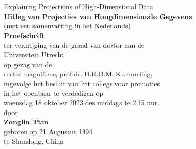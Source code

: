 \thispagestyle{empty}


\begin{addmargin}[0.5cm]{-1.5cm}

\begin{centering}
\Huge Explaining Projections of High-Dimensional Data\\[1.5em]
\large \textbf{Uitleg van Projecties van Hoogdimensionale Gegevens}\\[0.5em]
\large(met een samenvatting in het Nederlands)\\[2.5em]
\Large \textbf{Proefschrift}\\[2.5em]
 
\large ter verkrijging van de graad van doctor aan de\\
\large Universiteit Utrecht\\
\large op gezag van de\\
\large rector magnificus, prof.dr. H.R.B.M. Kummeling,\\
\large ingevolge het besluit van het college voor promoties\\
\large in het openbaar te verdedigen op\\[1em]
\large woensdag 18 oktober 2023 des middags te 2.15 uur.\\[2.5em] 
 
door\\[2.5em]
\Large{\textbf{Zonglin Tian}}\\[1em]
geboren op 21 Augustus 1994\\ te Shandong, China

\end{centering}

\end{addmargin}

